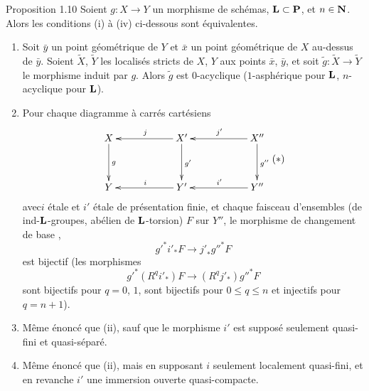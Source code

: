\documentclass[10pt]{../fichiers-configuration-latex/smfart}
\begin{document}
\begin{enonce*}{Proposition 1.10}
Soient $g:X\rightarrow Y$ un morphisme de schémas, $\mathbf{L}\subset
\mathbf{P}$, et $n\in \mathbf{N}$. Alors les conditions {\rm(i)} à
{\rm(iv)} ci-dessous sont équivalentes.
\begin{enumerate}
\renewcommand{\theenumi}{\roman{enumi}}
\renewcommand{\labelenumi}{(\theenumi)}
\item Soit $\bar{y}$ un point géométrique de $Y$ et $\bar{x}$ un point
géométrique de $X$ au-dessus de $\bar{y}$. Soient $\widetilde{X}$,
$\widetilde{Y}$ les localisés stricts de $X$, $Y$ aux points
$\bar{x}$, $\bar{y}$, et soit $\widetilde{g}:\widetilde{X}\rightarrow
\widetilde{Y}$ le morphisme induit par $g$. Alors $\widetilde{g}$ est
$0$-acyclique (\resp $1$-asphérique pour $\mathbf{L}$, \resp
$n$-acyclique pour $\mathbf{L}$).

\item Pour chaque diagramme à carrés cartésiens
$$
\vcenter{
\xymatrix@C=2cm@R=1.25cm{
X   \ar[d]^{g}& X'\ar[l]_{j}  \ar[d]^{g'} & X'' \ar[l]_{j'} \ar[d]^{g''}\\
Y    & Y'\ar[l]_{i} &   Y'' \ar[l]_{i'} 
}}\leqno{(\ast)}
$$
avec\pageoriginale $i$ étale et $i'$ étale de présentation finie, et
chaque faisceau d'ensembles (\resp de ind-$\mathbf{L}$-groupes, \resp
abélien de $\mathbf{L}$-torsion) $F$ sur $Y''$, le morphisme de
changement de base , 
$$
{g'}^{\ast}i'_{\ast}F\longrightarrow {j'}_{\ast}{g''}^{\ast}F
$$
est bijectif (\resp les morphismes
$$
{g'}^{\ast}(R^{q}i'_{\ast})F\longrightarrow
(R^{q}j'_{\ast}){g''}^{\ast}F
$$
sont bijectifs pour $q=0$, $1$, \resp sont bijectifs pour $0\leq q\leq
n$ et injectifs pour $q=n+1$).

\item Même énoncé que {\rm(ii)}, sauf que le morphisme $i'$ est
supposé seulement quasi-fini et quasi-séparé.

\item Même énoncé que {\rm(ii)}, mais en supposant $i$ seulement
localement quasi-fini, et en revanche $i'$ une immersion ouverte
quasi-compacte.
\end{enumerate}
\end{enonce*}
\end{document}
